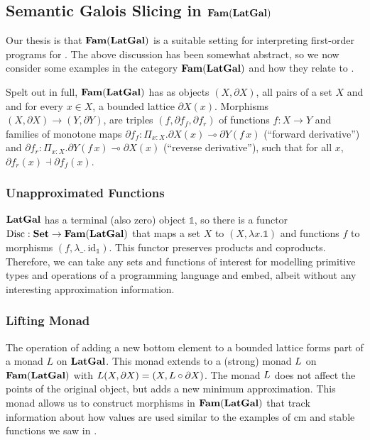 
\subsection{Semantic Galois Slicing in $\mathbf{Fam}(\mathbf{LatGal})$}
\label{sec:semantic-gps}

Our thesis is that $\mathbf{Fam}(\mathbf{LatGal})$ is a suitable setting for
interpreting first-order programs for \GPS. The above discussion has
been somewhat abstract, so we now consider some examples in the
category $\mathbf{Fam}(\mathbf{LatGal})$ and how they relate to \GPS.

Spelt out in full, $\mathbf{Fam}(\mathbf{LatGal})$ has as objects $(X, \partial X)$,
all pairs of a set $X$ and and for every $x \in X$, a bounded lattice
$\partial X(x)$. Morphisms $(X, \partial X) \to (Y, \partial Y)$, are
triples $(f, \partial f_f, \partial f_r)$ of functions $f : X \to Y$
and families of monotone maps
$\partial f_f : \Pi_{x : X}.\partial X(x) \multimap \partial Y(f\,x)$
(``forward derivative'') and
$\partial f_r : \Pi_{x : X}. \partial Y(f\,x) \multimap \partial X(x)$
(``reverse derivative''), such that for all $x$,
$\partial f_r(x) \dashv \partial f_f(x)$.

\subsubsection{Unapproximated Functions}
\label{sec:unapproximated-functions}

$\mathbf{LatGal}$ has a terminal (also zero) object $\mathbb{1}$, so there is
a functor $\mathrm{Disc} : \mathbf{Set} \to \mathbf{Fam}(\mathbf{LatGal})$ that maps a set $X$ to
$(X, \lambda x. \mathbb{1})$ and functions $f$ to morphisms
$(f, \lambda\_.\,\mathrm{id}_{\mathbb{1}})$. This functor preserves
products and coproducts. Therefore, we can take any sets and functions
of interest for modelling primitive types and operations of a
programming language and embed, albeit without any interesting
approximation information.

\subsubsection{Lifting Monad}
\label{sec:models-of-total-gps:lifting}

The operation of adding a new bottom element to a bounded lattice
forms part of a monad $L$ on $\mathbf{LatGal}$. This monad extends to a
(strong) monad $L$ on $\mathbf{Fam}(\mathbf{LatGal})$ with
$L(X, \partial X) = (X, L \circ \partial X)$. The monad $L$
does not affect the points of the original object, but adds a new
minimum approximation. This monad allows us to construct morphisms in
$\mathbf{Fam}(\mathbf{LatGal})$ that track information about how values are used
similar to the examples of cm and stable functions we saw in
.

